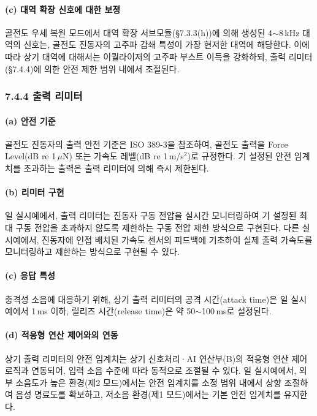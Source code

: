 \documentclass{article}
\begin{document}
\paragraph{(c) 대역 확장 신호에 대한 보정}

골전도 우세 복원 모드에서 대역 확장 서브모듈(§7.3.3(h))에 의해 생성된 4$\sim$8\,kHz 대역의 신호는, 골전도 진동자의 고주파 감쇄 특성이 가장 현저한 대역에 해당한다. 이에 따라 상기 대역에 대해서는 이퀄라이저의 고주파 부스트 이득을 강화하되, 출력 리미터(§7.4.4)에 의한 안전 제한 범위 내에서 조절된다.

\subsubsection{7.4.4 출력 리미터}

\paragraph{(a) 안전 기준}

골전도 진동자의 출력 안전 기준은 ISO 389-3을 참조하여, 골전도 출력을 Force Level(dB re 1\,$\mu$N) 또는 가속도 레벨(dB re 1\,m/s$^2$)로 규정한다. 기 설정된 안전 임계치를 초과하는 출력은 출력 리미터에 의해 즉시 제한된다.

\paragraph{(b) 리미터 구현}

일 실시예에서, 출력 리미터는 진동자 구동 전압을 실시간 모니터링하여 기 설정된 최대 구동 전압을 초과하지 않도록 제한하는 구동 전압 제한 방식으로 구현된다. 다른 실시예에서, 진동자에 인접 배치된 가속도 센서의 피드백에 기초하여 실제 출력 가속도를 모니터링하고 제한하는 방식으로 구현될 수 있다.

\paragraph{(c) 응답 특성}

충격성 소음에 대응하기 위해, 상기 출력 리미터의 공격 시간(attack time)은 일 실시예에서 1\,ms 이하, 릴리즈 시간(release time)은 약 50$\sim$100\,ms로 설정된다.

\paragraph{(d) 적응형 연산 제어와의 연동}

상기 출력 리미터의 안전 임계치는 상기 신호처리·AI 연산부(B)의 적응형 연산 제어 로직과 연동되어, 입력 소음 수준에 따라 동적으로 조절될 수 있다. 일 실시예에서, 외부 소음도가 높은 환경(제2 모드)에서는 안전 임계치를 소정 범위 내에서 상향 조절하여 음성 명료도를 확보하고, 저소음 환경(제1 모드)에서는 기본 안전 임계치를 유지한다.
\end{document}
